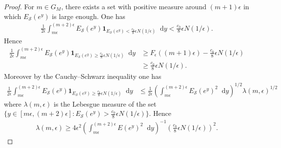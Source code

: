 \documentclass[a4paper,10pt]{amsart}
\theoremstyle{plain}
\theoremstyle{definition}
\begin{document}
\begin{proof}
For $m\in G_{M}$, there exists a set with positive measure around $(m+1)\epsilon$ in which $E_{\mathcal{S}}(e^{y})$ is large enough.
One has 
\begin{align*}
\frac{1}{2\epsilon}\int_{m\epsilon}^{(m+2)\epsilon} E_{\mathcal{S}}(e^{y})\mathbf{1}_{E_{\mathcal{S}}(e^{y})<\frac{c_{0}}{8}\epsilon N(1/\epsilon)}{\mathop{}\!\mathrm{d}} y
< \frac{c_{0}}{8}\epsilon N(1/\epsilon).
\end{align*}
Hence 
\begin{align*}
\frac{1}{2\epsilon}\int_{m\epsilon}^{(m+2)\epsilon} E_{\mathcal{S}}(e^{y})\mathbf{1}_{E_{\mathcal{S}}(e^{y})\geq\frac{c_{0}}{8}\epsilon N(1/\epsilon)}{\mathop{}\!\mathrm{d}} y
&\geq F_{\epsilon}((m+1)\epsilon) - \frac{c_{0}}{8}\epsilon N(1/\epsilon) \\
&\geq \frac{c_{0}}{8}\epsilon N(1/\epsilon).
\end{align*} 
Moreover by the Cauchy--Schwarz inequality one has
\begin{align*}
\frac{1}{2\epsilon}\int_{m\epsilon}^{(m+2)\epsilon} E_{\mathcal{S}}(e^{y})\mathbf{1}_{E_{\mathcal{S}}(e^{y})\geq\frac{c_{0}}{8}\epsilon N(1/\epsilon)}{\mathop{}\!\mathrm{d}} y
&\leq \frac{1}{2\epsilon} \left(\int_{m\epsilon}^{(m+2)\epsilon} E_{\mathcal{S}}(e^{y})^{2}{\mathop{}\!\mathrm{d}} y\right)^{1/2}
\lambda(m,\epsilon)^{1/2}
\end{align*}
where $\lambda(m,\epsilon)$ is the Lebesgue measure of the set $\lbrace y\in [m\epsilon,(m+2)\epsilon] : E_{\mathcal{S}}(e^{y})> \frac{c_{0}}{8}\epsilon N(1/\epsilon) \rbrace$.
Hence
\begin{align*}
\lambda(m,\epsilon) \geq 4\epsilon^{2} \left(\int_{m\epsilon}^{(m+2)\epsilon} E(e^{y})^{2}{\mathop{}\!\mathrm{d}} y\right)^{-1}
\left(\frac{c_{0}}{8}\epsilon N(1/\epsilon)\right)^{2}.
\end{align*}


\end{proof}
\end{document}
